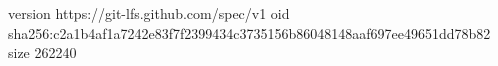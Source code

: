 version https://git-lfs.github.com/spec/v1
oid sha256:c2a1b4af1a7242e83f7f2399434c3735156b86048148aaf697ee49651dd78b82
size 262240
